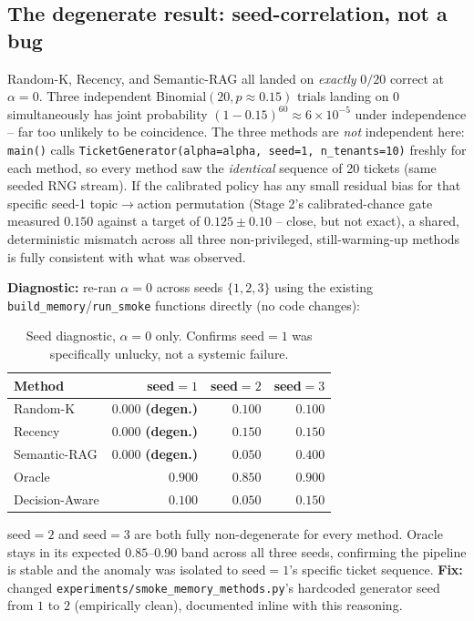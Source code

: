 \documentclass[11pt]{article}
\begin{document}
\subsection{The degenerate result: seed-correlation, not a bug}
\label{sec:seed-correlation}

Random-K, Recency, and Semantic-RAG all landed on \emph{exactly} $0/20$
correct at $\alpha=0$. Three independent Binomial$(20, p\approx0.15)$
trials landing on $0$ simultaneously has joint probability
$(1-0.15)^{60} \approx 6\times10^{-5}$ under independence -- far too
unlikely to be coincidence. The three methods are \emph{not} independent
here: \texttt{main()} calls \texttt{TicketGenerator(alpha=alpha, seed=1,
n\_tenants=10)} freshly for each method, so every method saw the
\emph{identical} sequence of 20 tickets (same seeded RNG stream). If the
calibrated policy has any small residual bias for that specific
seed-1 topic$\to$action permutation (Stage 2's calibrated-chance gate
measured $0.150$ against a target of $0.125\pm0.10$ -- close, but not
exact), a shared, deterministic mismatch across all three
non-privileged, still-warming-up methods is fully consistent with what
was observed.

\textbf{Diagnostic:} re-ran $\alpha=0$ across seeds $\{1,2,3\}$ using the
existing \texttt{build\_memory}/\texttt{run\_smoke} functions directly
(no code changes):

\begin{table}[h]
\centering
\begin{tabular}{lrrr}
\toprule
Method & seed$=1$ & seed$=2$ & seed$=3$ \\
\midrule
Random-K       & $0.000$ \textbf{(degen.)} & $0.100$ & $0.100$ \\
Recency        & $0.000$ \textbf{(degen.)} & $0.150$ & $0.150$ \\
Semantic-RAG   & $0.000$ \textbf{(degen.)} & $0.050$ & $0.400$ \\
Oracle         & $0.900$                   & $0.850$ & $0.900$ \\
Decision-Aware & $0.100$                   & $0.050$ & $0.150$ \\
\bottomrule
\end{tabular}
\caption{Seed diagnostic, $\alpha=0$ only. Confirms seed$=1$ was
specifically unlucky, not a systemic failure.}
\label{tab:seed-diagnostic}
\end{table}

seed$=2$ and seed$=3$ are both fully non-degenerate for every method.
Oracle stays in its expected $0.85$--$0.90$ band across all three seeds,
confirming the pipeline is stable and the anomaly was isolated to
seed$=1$'s specific ticket sequence. \textbf{Fix:} changed
\texttt{experiments/smoke\_memory\_methods.py}'s hardcoded generator seed
from $1$ to $2$ (empirically clean), documented inline with this
reasoning.
\end{document}
